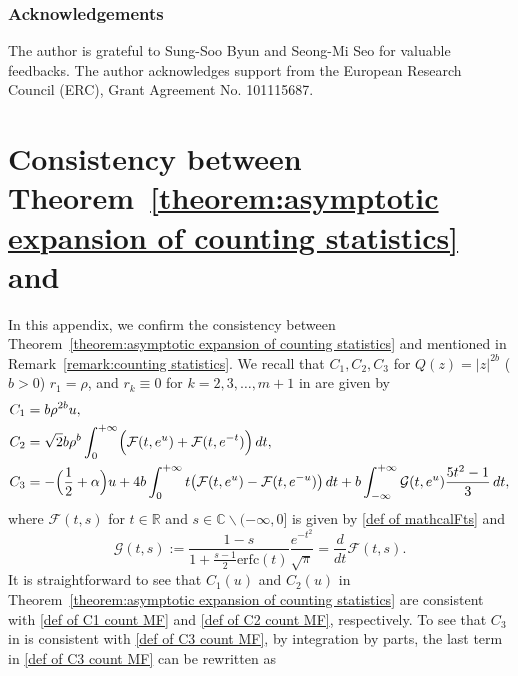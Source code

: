 \documentclass[reqno]{amsart}
\newcommand{\1}{\mathds{1}}
\newcommand{\C}{\mathds{C}}
\newcommand{\R}{\mathds{R}}
\numberwithin{equation}{section}
\theoremstyle{definition}
\begin{document}
\subsubsection*{Acknowledgements}
The author is grateful to Sung-Soo Byun and Seong-Mi Seo for valuable feedbacks.
The author acknowledges support from the European Research Council (ERC), Grant Agreement No. 101115687.%



\appendix
\section{Consistency between Theorem~\ref{theorem:asymptotic expansion of counting statistics} and \cite[Theorem~1.1]{C2021 FH}}
\label{section: appendix counting}
In this appendix, we confirm the consistency between Theorem~\ref{theorem:asymptotic expansion of counting statistics} and \cite[Theorem~1.1]{C2021 FH} mentioned in Remark~\ref{remark:counting statistics}. 
We recall that $C_1,C_2,C_3$ for $Q(z)=|z|^{2b}$ ($b>0$) $r_1=\rho$, and $r_{k}\equiv0$ for $k=2,3,\dots,m+1$ in \cite[Theorem 1.1]{C2021 FH} are given by 
\begin{align}
\label{def of C1 count MF}
C_1&=b\rho^{2b}u,
\\
\label{def of C2 count MF}
C_2&=\sqrt{2}b\rho^b\int_0^{+\infty}\Bigl(
\mathcal{F}(t,e^u)+\mathcal{F}(t,e^{-t})
\Bigr)\,dt, 
\\
\label{def of C3 count MF}
C_3&=-\Bigl(\frac{1}{2}+\alpha\Bigr)u+4b\int_0^{+\infty}t\bigl(\mathcal{F}(t,e^u)-\mathcal{F}(t,e^{-u})\bigr)\,dt
+b\int_{-\infty}^{+\infty}\mathcal{G}(t,e^u)\frac{5t^2-1}{3}\,dt, 
\end{align}
where $\mathcal{F}(t,s)$ for $t\in\R$ and $s\in\C\backslash(-\infty,0]$ is given by \eqref{def of mathcalFts} and 
\begin{equation*}
\mathcal{G}(t,s):= \frac{1-s}{1+\frac{s-1}{2}\mathrm{erfc}(t)}\frac{e^{-t^2}}{\sqrt{\pi}} =\frac{d}{dt}\mathcal{F}(t,s). 
\end{equation*}
It is straightforward to see that $C_{1}(u)$ and $C_2(u)$ in Theorem~\ref{theorem:asymptotic expansion of counting statistics} are consistent with \eqref{def of C1 count MF} and \eqref{def of C2 count MF}, respectively.
To see that $C_3$ in \cite[Theorem 1.1]{C2021 FH} is consistent with \eqref{def of C3 count MF}, by integration by parts, the last term in \eqref{def of C3 count MF} can be rewritten as
\end{document}
